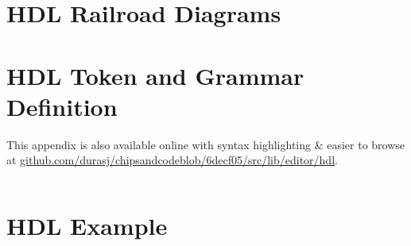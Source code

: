 \appendix

\chapter{HDL Railroad Diagrams}
\label{appendix:hdl-railroad}

\noindent


\vspace{20pt}

\noindent


\noindent


\vspace{20pt}

\noindent


\vspace{20pt}

\noindent


\vspace{20pt}

\noindent


\noindent


\vspace{20pt}

\noindent


\vspace{20pt}

\noindent


\vspace{20pt}

\noindent


\chapter{HDL Token and Grammar Definition}
\label{appendix:hdl-grammar}

This appendix is also available online with syntax highlighting \& easier to browse at \href{https://github.com/durasj/chipsandcode/blob/6decf05115ba1d4ca927de42f63c8431b1ac3124/src/lib/editor/hdl/grammar.ne}{github.com/durasj/chipsandcodeblob/6decf05/src/lib/editor/hdl}.

\inputminted[breaklines=true,fontsize=\footnotesize]{text}{./assets/hdl.ne}

\chapter{HDL Example}
\label{appendix:hdl-example}

